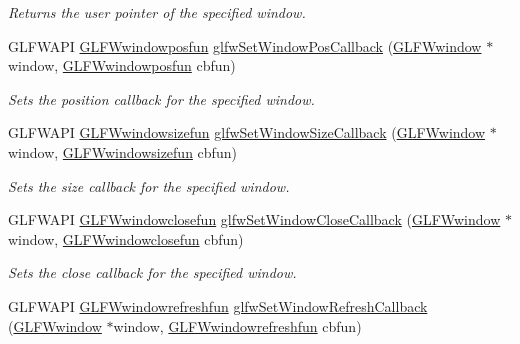 \begin{DoxyCompactItemize}
\begin{DoxyCompactList}\small\item\em Returns the user pointer of the specified window. \end{DoxyCompactList}\item 
G\+L\+F\+W\+A\+PI \hyperlink{group__window_gafd8db81fdb0e850549dc6bace5ed697a}{G\+L\+F\+Wwindowposfun} \hyperlink{group__window_gaea610899c4cb070dcd655c6de1fe1d2c}{glfw\+Set\+Window\+Pos\+Callback} (\hyperlink{group__window_ga3c96d80d363e67d13a41b5d1821f3242}{G\+L\+F\+Wwindow} $\ast$window, \hyperlink{group__window_gafd8db81fdb0e850549dc6bace5ed697a}{G\+L\+F\+Wwindowposfun} cbfun)
\begin{DoxyCompactList}\small\item\em Sets the position callback for the specified window. \end{DoxyCompactList}\item 
G\+L\+F\+W\+A\+PI \hyperlink{group__window_gae49ee6ebc03fa2da024b89943a331355}{G\+L\+F\+Wwindowsizefun} \hyperlink{group__window_ga150dad5f364425916c5816074cffa5e7}{glfw\+Set\+Window\+Size\+Callback} (\hyperlink{group__window_ga3c96d80d363e67d13a41b5d1821f3242}{G\+L\+F\+Wwindow} $\ast$window, \hyperlink{group__window_gae49ee6ebc03fa2da024b89943a331355}{G\+L\+F\+Wwindowsizefun} cbfun)
\begin{DoxyCompactList}\small\item\em Sets the size callback for the specified window. \end{DoxyCompactList}\item 
G\+L\+F\+W\+A\+PI \hyperlink{group__window_ga93e7c2555bd837f4ed8b20f76cada72e}{G\+L\+F\+Wwindowclosefun} \hyperlink{group__window_ga5b827da350141c789acd64f5c4f7a0e1}{glfw\+Set\+Window\+Close\+Callback} (\hyperlink{group__window_ga3c96d80d363e67d13a41b5d1821f3242}{G\+L\+F\+Wwindow} $\ast$window, \hyperlink{group__window_ga93e7c2555bd837f4ed8b20f76cada72e}{G\+L\+F\+Wwindowclosefun} cbfun)
\begin{DoxyCompactList}\small\item\em Sets the close callback for the specified window. \end{DoxyCompactList}\item 
G\+L\+F\+W\+A\+PI \hyperlink{group__window_ga7a56f9e0227e2cd9470d80d919032e08}{G\+L\+F\+Wwindowrefreshfun} \hyperlink{group__window_ga9d2621fbc271a0cdc0ce91f9749f46e3}{glfw\+Set\+Window\+Refresh\+Callback} (\hyperlink{group__window_ga3c96d80d363e67d13a41b5d1821f3242}{G\+L\+F\+Wwindow} $\ast$window, \hyperlink{group__window_ga7a56f9e0227e2cd9470d80d919032e08}{G\+L\+F\+Wwindowrefreshfun} cbfun)

\end{DoxyCompactItemize}
